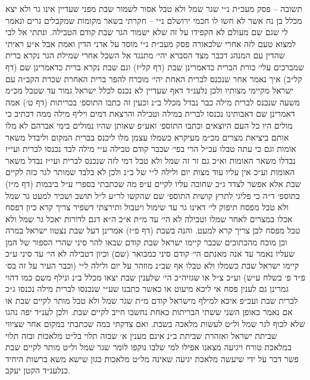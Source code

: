 \documentclass[12pt, openany]{book}
\begin{document}
\begin{multicols}{2}
תשובה – פסק מעכ״ת נ״י שגר שמל ולא טבל אסור לשמור שבת מפני שעדיין אינו גר ולא יצא מכלל בן נח אשר לא חשו לו חכמי ירושלם נ״י – חקרתי בשאר מקומות שמקבלים גרים ונאמר לי שגם שם מעולם לא הקפידו על זה שלא ישמור הגר שבת קודם הטבילה. ונתתי אל לבי למצוא טעם לזה אחרי שלכאורה פסק מעכ״ת נ״י מוסד על אדני הדין ואמת אבל א״ע ראיתי שהדין עם המנהג דכבר מצד הסברא יהי׳ מתנגד אל השכל אחרי שמילת הגר נקרא ברית שמברכים עלי׳ כורת הברית כדאמרינן שבת (דף קל״ז) וגם שבת נקרא ברית כדאמרינן שם (דף קל״ב) איך נאמר אחר שנכנס לברית האחת יהי׳ מוכרח להפר ברית האחרת שכרת הקב״ה עם ישראל מקיימי מצותיו ולכן נלענ״ד דאף שעדיין לא נכנס לכלל ישראל גמור עד שטבל מכ״מ משעה שנכנס לברית מילה כבר נבדל מכלל ב״נ וכעין זה כתבו התוספ׳ בכריתות (דף ט׳) אמה דאמרינן שם דאבותינו נכנסו לברית במילה וטבילה והרצאת דמים ויליף מילה ממה דכתיב כי מולים היו כל העם היוצאים וכתבו התוספ׳ ואע״פ שאותן שהיו נמולים בימי אברהם לא מלו אותם ביציאת מצרים מכ״מ מעיקרא כשמלו עצמן מלו ליכנס בברית המקום וליבדל משאר אומות וגם כי עתה טבלו עכ״ל הרי בפי׳ שכבר קודם טבילה ע״י מילה לבד נכנסו לברית ועי״ז נבדלו משאר האומות וא״כ גם זר זה שמל ולא טבל דמי לזה שנכנס לברית ועי״ז נבדל משאר האומות וע״כ אין עליו עוד מצות יום ולילה ל״י של ב״נ ולכן לא בלבד שמותר לגר כזה לקיים שבת אלא אפשר לצדד ג״כ שחובה עליו לקיים ע״פ מה שכתבתי בספרי ע״ל ביבמות (דף מ״ו) בתוספ׳ ד״ה כי פליגי לתרץ קושית התוספ׳ שם שהקשו לר״ע ל״ל תושב ושכיר למעט גר שמל ולא טבל מפסח תיפוק לי׳ דאינו גר עד שימול ויטבול ותירצתי דשפיר צריך קרא כיון דפסח אכלו במצרים לאחר שמלו וטבילה לא הי׳ עד מ״ת א״כ ה״א דגם לדורות יאכל גר שמל ולא טבל מפסח לכן צריך קרא למעט. והנה בשבת (דף פ״ז) אמרינן דעל שבת נצטוו ישראל במרה וכן מוכח מהכתובים שכבר קיימו ישראל שבת קודם שבאו להר סיני שהרי הספור של המן שעליו נאמר עד אנה מאנתם הי׳ קודם סיני כמבואר (שם) וכיון דטבילה לא הי׳ עד סיני ע״כ קיימו ישראל שבת כשמלו ולא טבלו אף שב״נ מוזהר על יום ולילה ל״י (וכבר העיר על זה בס׳ פ״ד פ׳ בשלח ע״ש) וע״כ צ״ל או שגזיה״כ הי׳ שלענין שבת יצאו מכלל ב״נ ונילף משם כמו דהוי גמרינן גם לענין פסח אי ליכא מיעוט או כאשר כתבנו שע״י שנכנסו לברית מילה נכנסו ג״כ לברית שבת ועכ״פ איכא למילף מישראל קודם מ״ת שגר שמל ולא טבל מותר לקיים שבת או אם נאמר כאופן השני ששתי הבריתות כאחת נחשבו חייב לקיים שבת. ולכן לענ״ד יפה נהגו שלא לכוף לגר שמל ול״ט לעשות מלאכה בשבת. ואם צדקתי במה שכתבתי במקום אחר שציווי שביתת ישראל ואזהרת שביתת ב״נ אינם מענין א׳ שבזה תלוי בל״ט מלאכות ובזה תלוי במלאכת טורח ויגיעה מצאנו אפילו למי שלבו נוקפו לומר שגר שמל ול״ט מותר לקיים שבת פשר דבר על ידי שיעשה מלאכת יגיעה שאינה מל״ט מלאכות כגון שישא משא ברשות היחיד כנלענ״ד הקטן יעקב.\\\vspace{0pt}

\end{multicols}\newpage
\end{document}
